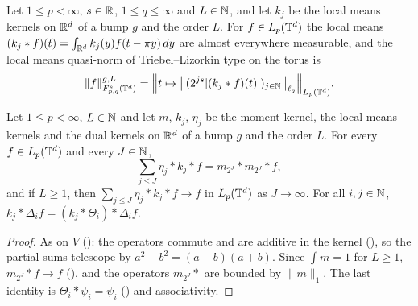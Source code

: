 \begin{definition}
\label{def:torus-tl-local-means}
\leanok
{}
Let $1 \leq p < \infty$, $s \in \mathbb{R}$, $1 \leq q \leq \infty$ and $L \in \mathbb{N}$, and let $k_j$ be the
local means kernels on $\mathbb{R}^d$ of a bump $g$ and the order $L$. For $f \in L_p(\mathbb{T}^d)$ the local
means $(k_j * f)(t) = \int_{\mathbb{R}^d} k_j(y) f(t - \pi y) \, dy$ are almost everywhere measurable,
and the local means quasi-norm of Triebel--Lizorkin type on the torus is
\[
  \|f\|^{g,L}_{F^s_{p,q}(\mathbb{T}^d)} = \Bigl\| t \mapsto \bigl\| (2^{js} |(k_j * f)(t)|)_{j \in \mathbb{N}}
  \bigr\|_{\ell_q} \Bigr\|_{L_p(\mathbb{T}^d)} .
\]
\end{definition}

\begin{lemma}
\label{lem:torus-reproducing-formula}
\leanok
{}
Let $1 \leq p < \infty$, $L \in \mathbb{N}$ and let $m$, $k_j$, $\eta_j$ be the moment kernel, the local
means kernels and the dual kernels on $\mathbb{R}^d$ of a bump $g$ and the order $L$. For every
$f \in L_p(\mathbb{T}^d)$ and every $J \in \mathbb{N}$,
\[
  \sum_{j \leq J} \eta_j * k_j * f = m_{2^J} * m_{2^J} * f ,
\]
and if $L \geq 1$, then $\sum_{j \leq J} \eta_j * k_j * f \to f$ in $L_p(\mathbb{T}^d)$ as $J \to \infty$.
For all $i, j \in \mathbb{N}$, $k_j * \Delta_i f = (k_j * \Theta_i) * \Delta_i f$.
\end{lemma}

\begin{proof}
\leanok
As on $V$ (): the operators commute and are additive in the
kernel (), so the partial sums telescope by
$a^2 - b^2 = (a - b)(a + b)$. Since $\int m = 1$ for $L \geq 1$, $m_{2^J} * f \to f$
(), and the operators $m_{2^J} *$ are bounded by $\|m\|_1$. The
last identity is $\Theta_i * \psi_i = \psi_i$ () and associativity.
\end{proof}

